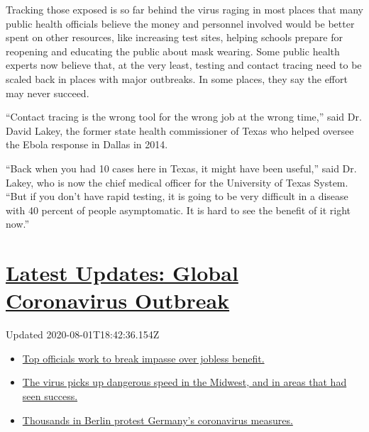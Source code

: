 Tracking those exposed is so far behind the virus raging in most places
that many public health officials believe the money and personnel
involved would be better spent on other resources, like increasing test
sites, helping schools prepare for reopening and educating the public
about mask wearing. Some public health experts now believe that, at the
very least, testing and contact tracing need to be scaled back in places
with major outbreaks. In some places, they say the effort may never
succeed.

``Contact tracing is the wrong tool for the wrong job at the wrong
time,'' said Dr. David Lakey, the former state health commissioner of
Texas who helped oversee the Ebola response in Dallas in 2014.

``Back when you had 10 cases here in Texas, it might have been useful,''
said Dr. Lakey, who is now the chief medical officer for the University
of Texas System. ``But if you don't have rapid testing, it is going to
be very difficult in a disease with 40 percent of people asymptomatic.
It is hard to see the benefit of it right now.''

\hypertarget{latest-updates-global-coronavirus-outbreak}{%
\section{\texorpdfstring{\href{https://www.nytimes.com/2020/08/01/world/coronavirus-covid-19.html?action=click\&pgtype=Article\&state=default\&region=MAIN_CONTENT_1\&context=storylines_live_updates}{Latest
Updates: Global Coronavirus
Outbreak}}{Latest Updates: Global Coronavirus Outbreak}}\label{latest-updates-global-coronavirus-outbreak}}

Updated 2020-08-01T18:42:36.154Z

\begin{itemize}
\tightlist
\item
  \href{https://www.nytimes.com/2020/08/01/world/coronavirus-covid-19.html?action=click\&pgtype=Article\&state=default\&region=MAIN_CONTENT_1\&context=storylines_live_updates\#link-3ac56579}{Top
  officials work to break impasse over jobless benefit.}
\item
  \href{https://www.nytimes.com/2020/08/01/world/coronavirus-covid-19.html?action=click\&pgtype=Article\&state=default\&region=MAIN_CONTENT_1\&context=storylines_live_updates\#link-8796723}{The
  virus picks up dangerous speed in the Midwest, and in areas that had
  seen success.}
\item
  \href{https://www.nytimes.com/2020/08/01/world/coronavirus-covid-19.html?action=click\&pgtype=Article\&state=default\&region=MAIN_CONTENT_1\&context=storylines_live_updates\#link-25930521}{Thousands
  in Berlin protest Germany's coronavirus measures.}
\end{itemize}

